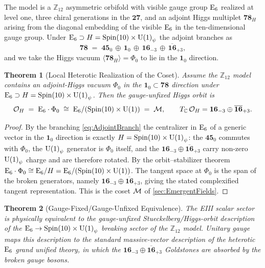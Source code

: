 \documentclass[pdflatex,sn-mathphys-num]{sn-jnl}
\theoremstyle{thmstyleone}
\newtheorem{theorem}{Theorem}
\theoremstyle{thmstylethree}%
\theoremstyle{thmstyletwo}%
\begin{document}
The model is a $\mathbb Z_{12}$ asymmetric orbifold with visible gauge group
$\mathrm{E}_{6}$ realized at level one, three chiral generations in the $\mathbf{27}$, and an
adjoint Higgs multiplet $\mathbf{78}_{H}$ arising from the diagonal embedding of the
visible $\mathrm{E}_{6}$ in the ten-dimensional gauge group.  Under
$\mathrm{E}_{6}\supset H=\operatorname{Spin}(10) \times \mathrm{U(1)}_\psi$ the adjoint branches as
\begin{equation}
  \mathbf{78}
  \;=\;
  \mathbf{45}_{0}\,\oplus\,\mathbf{1}_{0}\,\oplus\,
  \mathbf{16}_{-3}\,\oplus\,\overline{\mathbf{16}}_{+3},
  \label{eq:AdjointBranch}
\end{equation}
and we take the Higgs vacuum $\langle\mathbf{78}_{H}\rangle=\Phi_{0}$ to lie in
the $\mathbf{1}_{0}$ direction.

\begin{theorem}[Local Heterotic Realization of the Coset]
\label{thm:Z12Orbit}
Assume the $\mathbb Z_{12}$ model contains an adjoint-Higgs vacuum
\(\Phi_{0}\) in the $\mathbf{1}_{0}\subset\mathbf{78}$ direction under
$\mathrm{E}_{6}\supset H=\operatorname{Spin}(10) \times \mathrm{U(1)}_\psi$.  Then the gauge-unfixed Higgs orbit is
\[
  \mathcal O_{H}
  \;=\;\mathrm{E}_{6}\cdot\Phi_{0}
  \;\cong\;\mathrm{E}_{6}/(\operatorname{Spin}(10) \times \mathrm{U(1)})
  \;=\;\mathcal{M},
  \qquad
  T_{\mathbb C}\,\mathcal O_{H}
  =
  \mathbf{16}_{-3}\oplus\overline{\mathbf{16}}_{+3}.
\]
\end{theorem}

\begin{proof}
By the branching \eqref{eq:AdjointBranch} the centralizer in $\mathrm{E}_{6}$ of a
generic vector in the $\mathbf{1}_{0}$ direction is exactly $H=\operatorname{Spin}(10) \times \mathrm{U(1)}_\psi$: the
$\mathbf{45}_{0}$ commutes with $\Phi_{0}$, the $\mathrm{U(1)}_\psi$ generator is $\Phi_{0}$
itself, and the $\mathbf{16}_{-3}\oplus\overline{\mathbf{16}}_{+3}$ carry non-zero $\mathrm{U(1)}_\psi$
charge and are therefore rotated.  By the orbit--stabilizer theorem
$\mathrm{E}_{6}\cdot\Phi_{0}\cong\mathrm{E}_{6}/H=\mathrm{E}_{6}/(\operatorname{Spin}(10) \times \mathrm{U(1)})$.  The tangent space at $\Phi_{0}$
is the span of the broken generators, namely
$\mathbf{16}_{-3}\oplus\overline{\mathbf{16}}_{+3}$, giving the stated complexified tangent
representation.  This is the coset $\mathcal{M}$ of \autoref{sec:EmergentFields}.
\end{proof}

\begin{theorem}[Gauge-Fixed/Gauge-Unfixed Equivalence]
\label{thm:Z12Equivalence}
The EIII scalar sector is physically equivalent to the gauge-unfixed
Stueckelberg/Higgs-orbit description of the $\mathrm{E}_{6}\to\operatorname{Spin}(10) \times \mathrm{U(1)}_\psi$ breaking
sector of the $\mathbb Z_{12}$ model.  Unitary gauge maps this description to the
standard massive-vector description of the heterotic $\mathrm{E}_{6}$ grand unified
theory, in which the $\mathbf{16}_{-3}\oplus\overline{\mathbf{16}}_{+3}$ Goldstones are absorbed by
the broken gauge bosons.
\end{theorem}
\end{document}
